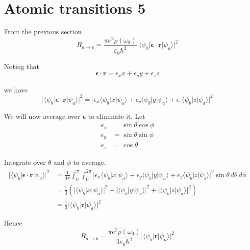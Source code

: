 

\section*{Atomic transitions 5}

From the previous section
\begin{equation*}
R_{a\rightarrow b}
=\frac{\pi e^2\rho(\omega_0)}{\varepsilon_0\hbar^2}
\bigl|\langle\psi_b|\boldsymbol{\epsilon}\cdot\mathbf r|\psi_a\rangle\bigr|^2
\end{equation*}

Noting that
\begin{equation*}
\boldsymbol{\epsilon}\cdot\mathbf r=\epsilon_xx+\epsilon_yy+\epsilon_zz
\end{equation*}

we have
\begin{equation*}
\bigl|\langle\psi_b|\boldsymbol{\epsilon}\cdot\mathbf r|\psi_a\rangle\bigr|^2
=\bigl|
\epsilon_x\langle\psi_b|x|\psi_a\rangle
+\epsilon_y\langle\psi_b|y|\psi_a\rangle
+\epsilon_z\langle\psi_b|z|\psi_a\rangle
\bigr|^2
\end{equation*}

We will now average over $\boldsymbol\epsilon$ to eliminate it.
Let
\begin{align*}
e_x&=\sin\theta\cos\phi
\\
e_y&=\sin\theta\sin\phi
\\
e_z&=\cos\theta
\end{align*}

Integrate over $\theta$ and $\phi$ to average.
\begin{align*}
\overline{\bigl|\langle\psi_b|\boldsymbol{\epsilon}\cdot\mathbf r|\psi_a\rangle\bigr|^2}
&=\frac{1}{4\pi}\int_0^\pi\int_0^{2\pi}
\bigl|
\epsilon_x\langle\psi_b|x|\psi_a\rangle
+\epsilon_y\langle\psi_b|y|\psi_a\rangle
+\epsilon_z\langle\psi_b|z|\psi_a\rangle
\bigr|^2\sin\theta\,d\theta\,d\phi
\\
&=\frac{1}{3}\left(
\bigl|\langle\psi_b|x|\psi_a\rangle\bigr|^2
+\bigl|\langle\psi_b|y|\psi_a\rangle\bigr|^2
+\bigl|\langle\psi_b|z|\psi_a\rangle\bigr|^2
\right)
\\
&=\frac{1}{3}\bigl|\langle\psi_b|\mathbf r|\psi_a\rangle\bigr|^2
\tag{1}
\end{align*}

Hence
\begin{equation*}
R_{a\rightarrow b}
=\frac{\pi e^2\rho(\omega_0)}{3\varepsilon_0\hbar^2}
\bigl|\langle\psi_b|\mathbf r|\psi_a\rangle\bigr|^2
\end{equation*}


